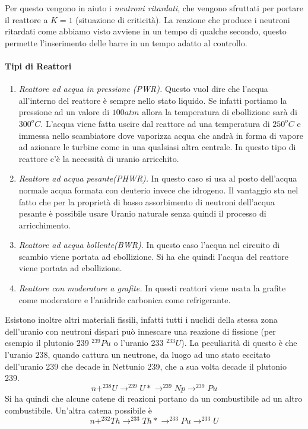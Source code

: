 Per questo vengono in aiuto i \emph{neutroni ritardati}, che vengono sfruttati per portare il reattore a $K=1$ (situazione di criticità).
La reazione che produce i neutroni ritardati come abbiamo visto avviene in un tempo di qualche secondo, questo permette l'inserimento delle barre in un tempo adatto al controllo.

\paragraph{Tipi di Reattori}
\begin{enumerate}
\item \emph{Reattore ad acqua in pressione (PWR).} 
Questo vuol dire che l'acqua all'interno del reattore è sempre nello stato liquido. 
Se infatti portiamo la pressione ad un valore di $100 atm$ allora la temperatura di ebollizione sarà di $300^oC$.
L'acqua viene fatta uscire dal reattore ad una temperatura di $250^oC$ e immessa nello scambiatore dove vaporizza acqua che andrà in forma di vapore ad azionare le turbine come in una qualsiasi altra centrale.
In questo tipo di reattore c'è la necessità di uranio arricchito.

\item \emph{Reattore ad acqua pesante(PHWR).}
In questo caso si usa al posto dell'acqua normale acqua formata con deuterio invece che idrogeno.
Il vantaggio sta nel fatto che per la proprietà di basso assorbimento di neutroni dell'acqua pesante è possibile usare Uranio naturale senza quindi il processo di arricchimento.

\item \emph{Reattore ad acqua bollente(BWR).}
In questo caso l'acqua nel circuito di scambio viene portata ad ebollizione. Si ha che quindi l'acqua del reattore viene portata ad ebollizione.

\item \emph{Reattore con moderatore a grafite.}
In questi reattori viene usata la grafite come moderatore e l'anidride carbonica come refrigerante.
\end{enumerate}

Esistono inoltre altri materiali fissili, infatti tutti i nuclidi della stessa zona dell'uranio con neutroni dispari può innescare una reazione di fissione (per esempio il plutonio 239 $^{239}Pu$ o l'uranio 233 $^{233}U$).
La peculiarità di questo è che l'uranio 238, quando cattura un neutrone, da luogo ad uno stato eccitato dell'uranio 239 che decade in Nettunio 239, che a sua volta decade il plutonio 239.
\begin{equation}
n+ ^{238}U\to ^{239}U*\to ^{239}Np\to ^{239}Pu
\end{equation}
Si ha quindi che alcune catene di reazioni portano da un combustibile ad un altro combustibile.
Un'altra catena possibile è 
\begin{equation}
n+^{232}Th\to ^{233}Th*\to ^{233}Pu\to ^{233}U
\end{equation}

